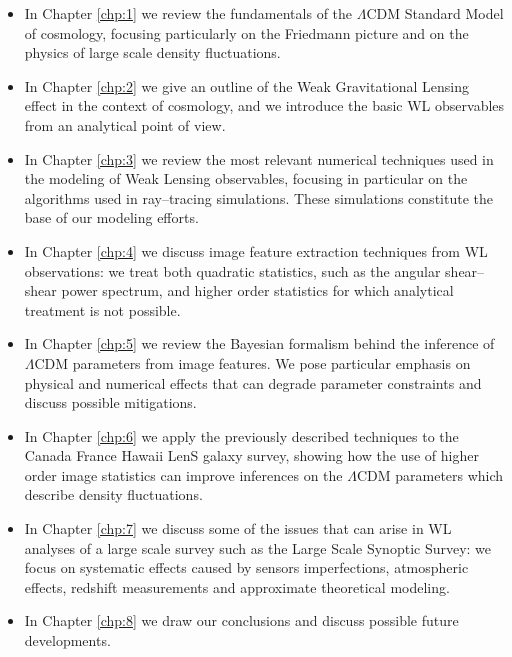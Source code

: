 \begin{itemize}

	\item In Chapter \ref{chp:1} we review the fundamentals of the $\Lambda$CDM Standard Model of cosmology, focusing particularly on the Friedmann picture and on the physics of large scale density fluctuations.
	
	\item In Chapter \ref{chp:2} we give an outline of the Weak Gravitational Lensing effect in the context of cosmology, and we introduce the basic WL observables from an analytical point of view.
	
	\item In Chapter \ref{chp:3} we review the most relevant numerical techniques used in the modeling of Weak Lensing observables, focusing in particular on the algorithms used in ray--tracing simulations. These simulations constitute the base of our modeling efforts.  
	
	\item In Chapter \ref{chp:4} we discuss image feature extraction techniques from WL observations: we treat both quadratic statistics, such as the angular shear--shear power spectrum, and higher order statistics for which analytical treatment is not possible.
	
	\item In Chapter \ref{chp:5} we review the Bayesian formalism behind the inference of $\Lambda$CDM parameters from image features. We pose particular emphasis on physical and numerical effects that can degrade parameter constraints and discuss possible mitigations.
	
	\item In Chapter \ref{chp:6} we apply the previously described techniques to the Canada France Hawaii LenS galaxy survey, showing how the use of higher order image statistics can improve inferences on the $\Lambda$CDM parameters which describe density fluctuations. 
	
	\item In Chapter \ref{chp:7} we discuss some of the issues that can arise in WL analyses of a large scale survey such as the Large Scale Synoptic Survey: we focus on systematic effects caused by sensors imperfections, atmospheric effects, redshift measurements and approximate theoretical modeling.
	
	\item In Chapter \ref{chp:8} we draw our conclusions and discuss possible future developments.

\end{itemize}